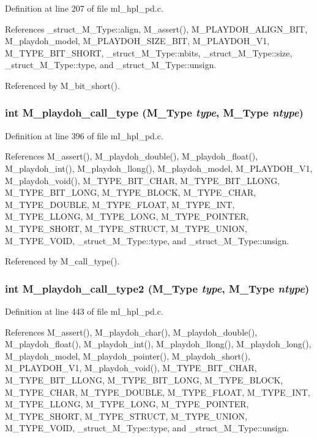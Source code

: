 Definition at line 207 of file ml\_\-hpl\_\-pd.c.

References \_\-struct\_\-M\_\-Type::align, M\_\-assert(), M\_\-PLAYDOH\_\-ALIGN\_\-BIT, M\_\-playdoh\_\-model, M\_\-PLAYDOH\_\-SIZE\_\-BIT, M\_\-PLAYDOH\_\-V1, M\_\-TYPE\_\-BIT\_\-SHORT, \_\-struct\_\-M\_\-Type::nbits, \_\-struct\_\-M\_\-Type::size, \_\-struct\_\-M\_\-Type::type, and \_\-struct\_\-M\_\-Type::unsign.

Referenced by M\_\-bit\_\-short().
\subsubsection{\setlength{\rightskip}{0pt plus 5cm}int M\_\-playdoh\_\-call\_\-type (\bf{M\_\-Type} {\em type}, \bf{M\_\-Type} {\em ntype})}\label{ml__hpl__pd_8c_ce9de15085873026b09e38ac6d6514b4}




Definition at line 396 of file ml\_\-hpl\_\-pd.c.

References M\_\-assert(), M\_\-playdoh\_\-double(), M\_\-playdoh\_\-float(), M\_\-playdoh\_\-int(), M\_\-playdoh\_\-llong(), M\_\-playdoh\_\-model, M\_\-PLAYDOH\_\-V1, M\_\-playdoh\_\-void(), M\_\-TYPE\_\-BIT\_\-CHAR, M\_\-TYPE\_\-BIT\_\-LLONG, M\_\-TYPE\_\-BIT\_\-LONG, M\_\-TYPE\_\-BLOCK, M\_\-TYPE\_\-CHAR, M\_\-TYPE\_\-DOUBLE, M\_\-TYPE\_\-FLOAT, M\_\-TYPE\_\-INT, M\_\-TYPE\_\-LLONG, M\_\-TYPE\_\-LONG, M\_\-TYPE\_\-POINTER, M\_\-TYPE\_\-SHORT, M\_\-TYPE\_\-STRUCT, M\_\-TYPE\_\-UNION, M\_\-TYPE\_\-VOID, \_\-struct\_\-M\_\-Type::type, and \_\-struct\_\-M\_\-Type::unsign.

Referenced by M\_\-call\_\-type().
\subsubsection{\setlength{\rightskip}{0pt plus 5cm}int M\_\-playdoh\_\-call\_\-type2 (\bf{M\_\-Type} {\em type}, \bf{M\_\-Type} {\em ntype})}\label{ml__hpl__pd_8c_4ab4d548a5ec53628196b3cab02b27dd}




Definition at line 443 of file ml\_\-hpl\_\-pd.c.

References M\_\-assert(), M\_\-playdoh\_\-char(), M\_\-playdoh\_\-double(), M\_\-playdoh\_\-float(), M\_\-playdoh\_\-int(), M\_\-playdoh\_\-llong(), M\_\-playdoh\_\-long(), M\_\-playdoh\_\-model, M\_\-playdoh\_\-pointer(), M\_\-playdoh\_\-short(), M\_\-PLAYDOH\_\-V1, M\_\-playdoh\_\-void(), M\_\-TYPE\_\-BIT\_\-CHAR, M\_\-TYPE\_\-BIT\_\-LLONG, M\_\-TYPE\_\-BIT\_\-LONG, M\_\-TYPE\_\-BLOCK, M\_\-TYPE\_\-CHAR, M\_\-TYPE\_\-DOUBLE, M\_\-TYPE\_\-FLOAT, M\_\-TYPE\_\-INT, M\_\-TYPE\_\-LLONG, M\_\-TYPE\_\-LONG, M\_\-TYPE\_\-POINTER, M\_\-TYPE\_\-SHORT, M\_\-TYPE\_\-STRUCT, M\_\-TYPE\_\-UNION, M\_\-TYPE\_\-VOID, \_\-struct\_\-M\_\-Type::type, and \_\-struct\_\-M\_\-Type::unsign.

